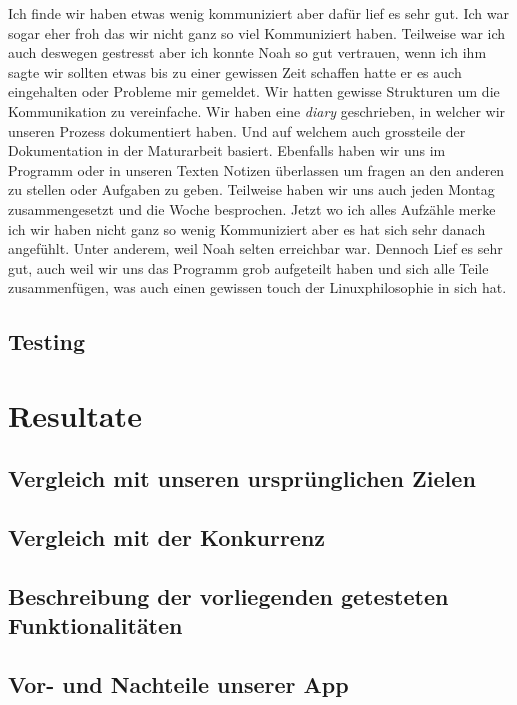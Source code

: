 \documentclass[a4paper,11pt]{article}
\begin{document}
Ich finde wir haben etwas wenig kommuniziert aber dafür lief es sehr gut. Ich war sogar eher froh das wir nicht ganz so viel 
Kommuniziert haben. Teilweise war ich auch deswegen gestresst aber ich konnte Noah so gut vertrauen, wenn ich ihm sagte wir sollten etwas bis zu einer gewissen Zeit schaffen
hatte er es auch eingehalten oder Probleme mir gemeldet. Wir hatten gewisse Strukturen um die Kommunikation zu vereinfache. Wir haben 
eine \textit{diary} geschrieben, in welcher wir unseren Prozess dokumentiert haben. Und auf welchem auch grossteile der Dokumentation in der Maturarbeit basiert. 
Ebenfalls haben wir uns im Programm oder in unseren Texten Notizen überlassen um fragen an den anderen zu stellen oder Aufgaben zu geben. Teilweise haben wir uns auch jeden Montag zusammengesetzt
und die Woche besprochen. Jetzt wo ich alles Aufzähle merke ich wir haben nicht ganz so wenig Kommuniziert aber es hat sich sehr danach angefühlt. Unter anderem, weil Noah selten erreichbar
war. Dennoch Lief es sehr gut, auch weil wir uns das Programm grob aufgeteilt haben und sich alle Teile zusammenfügen, was auch einen gewissen touch der Linuxphilosophie in sich hat. 


\subsection{Testing}

\section{Resultate}
\subsection{Vergleich mit unseren ursprünglichen Zielen}
\subsection{Vergleich mit der Konkurrenz}
\subsection{Beschreibung der vorliegenden getesteten Funktionalitäten}
\subsection{Vor- und Nachteile unserer App}
\end{document}
